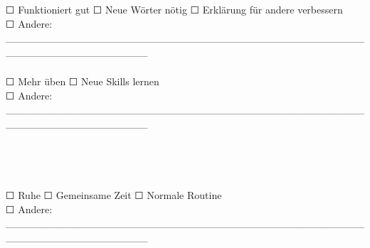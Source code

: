 \hypertarget{safe-word-system-anpassen}{%
\subsubsection[\textbf{\textcolor{ctmmBlue}{\1}}]{\texorpdfstring{\protect\hypertarget{safe-word-system-anpassen}{}{}\textbf{\textcolor{ctmmBlue}{\1}}}{Safe-Word-System anpassen:}}\label{safe-word-system-anpassen}}

☐ Funktioniert gut ☐ Neue Wörter nötig ☐ Erklärung für andere verbessern\\
☐ Andere: \_\_\_\_\_\_\_\_\_\_\_\_\_\_\_\_\_\_\_\_\_\_\_\_\_\_\_\_\_\_\_\_\_\_\_\_\_\_\_\_\_\_\_\_\_\_\_\_\_\_\_\_\_\_\_\_\_\_\_\_\_\_\_\_\_\_\_

\hfill\break
\hfill\break

\hypertarget{skills-training-anpassen}{%
\subsubsection[\textbf{\textcolor{ctmmBlue}{\1}}]{\texorpdfstring{\protect\hypertarget{skills-training-anpassen}{}{}\textbf{\textcolor{ctmmBlue}{\1}}}{Skills-Training anpassen:}}\label{skills-training-anpassen}}

☐ Mehr üben ☐ Neue Skills lernen\\
☐ Andere: \_\_\_\_\_\_\_\_\_\_\_\_\_\_\_\_\_\_\_\_\_\_\_\_\_\_\_\_\_\_\_\_\_\_\_\_\_\_\_\_\_\_\_\_\_\_\_\_\_\_\_\_\_\_\_\_\_\_\_\_\_\_\_\_\_\_\_

\hfill\break
\hfill\break

\hypertarget{follow-up-aktionen}{%
\subsection[🎯 \ul{\textbf{\textcolor{ctmmBlue}{\1}}}]{\texorpdfstring{\protect\hypertarget{follow-up-aktionen}{}{}🎯 \ul{\textbf{\textcolor{ctmmBlue}{\1}}}}{🎯 FOLLOW-UP AKTIONEN}}\label{follow-up-aktionen}}

\hypertarget{heute-noch}{%
\subsubsection[\textbf{\textcolor{ctmmBlue}{\1}}]{\texorpdfstring{\protect\hypertarget{heute-noch}{}{}\textbf{\textcolor{ctmmBlue}{\1}}}{Heute noch:}}\label{heute-noch}}

☐ Ruhe ☐ Gemeinsame Zeit ☐ Normale Routine\\
☐ Andere: \_\_\_\_\_\_\_\_\_\_\_\_\_\_\_\_\_\_\_\_\_\_\_\_\_\_\_\_\_\_\_\_\_\_\_\_\_\_\_\_\_\_\_\_\_\_\_\_\_\_\_\_\_\_\_\_\_\_\_\_\_\_\_\_\_\_\_

